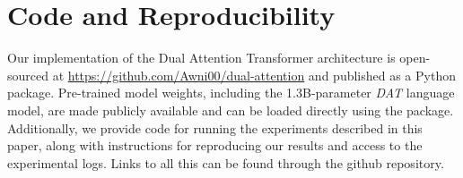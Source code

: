 \section*{Code and Reproducibility}

Our implementation of the Dual Attention Transformer architecture is open-sourced at \url{https://github.com/Awni00/dual-attention} and published as a Python package. Pre-trained model weights, including the 1.3B-parameter \textit{DAT} language model, are made publicly available and can be loaded directly using the package. Additionally, we provide code for running the experiments described in this paper, along with instructions for reproducing our results and access to the experimental logs. Links to all this can be found through the github repository.